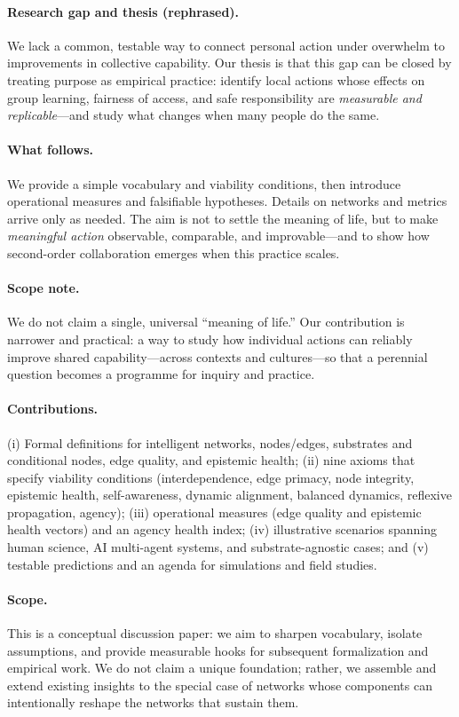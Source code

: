 \documentclass[12pt]{article}
\begin{document}
\paragraph{Research gap and thesis (rephrased).}
We lack a common, testable way to connect personal action under overwhelm to improvements in collective capability. Our thesis is that this gap can be closed by treating purpose as empirical practice: identify local actions whose effects on group learning, fairness of access, and safe responsibility are \emph{measurable and replicable}—and study what changes when many people do the same.

\paragraph{What follows.}
We provide a simple vocabulary and viability conditions, then introduce operational measures and falsifiable hypotheses. Details on networks and metrics arrive only as needed. The aim is not to settle the meaning of life, but to make \emph{meaningful action} observable, comparable, and improvable—and to show how second-order collaboration emerges when this practice scales.

\paragraph{Scope note.}
We do not claim a single, universal ``meaning of life.'' Our contribution is narrower and practical: a way to study how individual actions can reliably improve shared capability—across contexts and cultures—so that a perennial question becomes a programme for inquiry and practice.

\paragraph{Contributions.}
(i) Formal definitions for intelligent networks, nodes/edges, substrates and conditional nodes, edge quality, and epistemic health; (ii) nine axioms that specify viability conditions (interdependence, edge primacy, node integrity, epistemic health, self-awareness, dynamic alignment, balanced dynamics, reflexive propagation, agency); (iii) operational measures (edge quality and epistemic health vectors) and an agency health index; (iv) illustrative scenarios spanning human science, AI multi-agent systems, and substrate-agnostic cases; and (v) testable predictions and an agenda for simulations and field studies.

\paragraph{Scope.}
This is a conceptual discussion paper: we aim to sharpen vocabulary, isolate assumptions, and provide measurable hooks for subsequent formalization and empirical work. We do not claim a unique foundation; rather, we assemble and extend existing insights to the special case of networks whose components can intentionally reshape the networks that sustain them.
\end{document}
